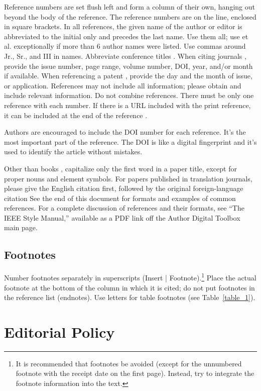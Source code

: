 \documentclass[journal]{IEEEtranTIE}
\begin{document}
Reference numbers are set flush left and form a column of their own, hanging out beyond the body of the reference. The reference numbers are on the line, enclosed in square brackets. In all references, the given name of the author or editor is abbreviated to the initial only and precedes the last name. Use them all; use et al. exceptionally if more than 6 author names were listed. Use commas around Jr., Sr., and III in names. Abbreviate conference titles \cite{inproceedings1}.  When citing journals \cite{article1, article2}, provide the issue number, page range, volume number, DOI, year, and/or month if available. When referencing a patent \cite{patent1}, provide the day and the month of issue, or application. References may not include all information; please obtain and include relevant information. Do not combine references. There must be only one reference with each number. If there is a URL included with the print reference, it can be included at the end of the reference \cite{onlinebook1}.

Authors are encouraged to include the DOI number for each reference. It's the most important part of the reference. The DOI is like a digital fingerprint and it's used to identify the article without mistakes.

Other than books \cite{inbook1, book1}, capitalize only the first word in a paper title, except for proper nouns and element symbols. For papers published in translation journals, please give the English citation first, followed by the original foreign-language citation See the end of this document for formats and examples of common references. For a complete discussion of references and their formats, see ``The IEEE Style Manual,'' available as a PDF link off the Author Digital Toolbox main page.

\subsection{Footnotes}
Number footnotes separately in superscripts (Insert | Footnote).\footnote{It is recommended that footnotes be avoided (except for the unnumbered footnote with the receipt date on the first page). Instead, try to integrate the footnote information into the text.}  Place the actual footnote at the bottom of the column in which it is cited; do not put footnotes in the reference list (endnotes). Use letters for table footnotes  (see \mbox{Table \ref{table_1}}).


\section{Editorial Policy}
\end{document}
